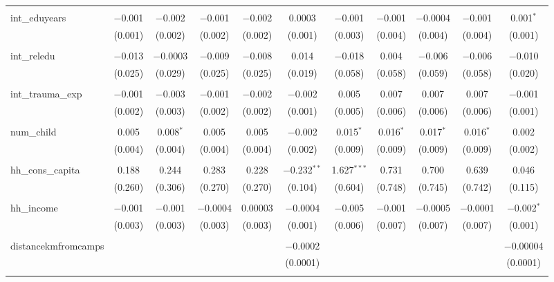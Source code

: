 \begin{table}[H]
\begin{tabular}{@{\extracolsep{4pt}}lcccccccccc}
  & & & & & & & & & & \\ 
 int\_eduyears & $-$0.001 & $-$0.002 & $-$0.001 & $-$0.002 & 0.0003 & $-$0.001 & $-$0.001 & $-$0.0004 & $-$0.001 & 0.001$^{*}$ \\ 
  & (0.001) & (0.002) & (0.002) & (0.002) & (0.001) & (0.003) & (0.004) & (0.004) & (0.004) & (0.001) \\ 
  & & & & & & & & & & \\ 
 int\_reledu & $-$0.013 & $-$0.0003 & $-$0.009 & $-$0.008 & 0.014 & $-$0.018 & 0.004 & $-$0.006 & $-$0.006 & $-$0.010 \\ 
  & (0.025) & (0.029) & (0.025) & (0.025) & (0.019) & (0.058) & (0.058) & (0.059) & (0.058) & (0.020) \\ 
  & & & & & & & & & & \\ 
 int\_trauma\_exp & $-$0.001 & $-$0.003 & $-$0.001 & $-$0.002 & $-$0.002 & 0.005 & 0.007 & 0.007 & 0.007 & $-$0.001 \\ 
  & (0.002) & (0.003) & (0.002) & (0.002) & (0.001) & (0.005) & (0.006) & (0.006) & (0.006) & (0.001) \\ 
  & & & & & & & & & & \\ 
 num\_child & 0.005 & 0.008$^{*}$ & 0.005 & 0.005 & $-$0.002 & 0.015$^{*}$ & 0.016$^{*}$ & 0.017$^{*}$ & 0.016$^{*}$ & 0.002 \\ 
  & (0.004) & (0.004) & (0.004) & (0.004) & (0.002) & (0.009) & (0.009) & (0.009) & (0.009) & (0.002) \\ 
  & & & & & & & & & & \\ 
 hh\_cons\_capita & 0.188 & 0.244 & 0.283 & 0.228 & $-$0.232$^{**}$ & 1.627$^{***}$ & 0.731 & 0.700 & 0.639 & 0.046 \\ 
  & (0.260) & (0.306) & (0.270) & (0.270) & (0.104) & (0.604) & (0.748) & (0.745) & (0.742) & (0.115) \\ 
  & & & & & & & & & & \\ 
 hh\_income & $-$0.001 & $-$0.001 & $-$0.0004 & 0.00003 & $-$0.0004 & $-$0.005 & $-$0.001 & $-$0.0005 & $-$0.0001 & $-$0.002$^{*}$ \\ 
  & (0.003) & (0.003) & (0.003) & (0.003) & (0.001) & (0.006) & (0.007) & (0.007) & (0.007) & (0.001) \\ 
  & & & & & & & & & & \\ 
 distancekmfromcamps &  &  &  &  & $-$0.0002 &  &  &  &  & $-$0.00004 \\ 
  &  &  &  &  & (0.0001) &  &  &  &  & (0.0001) \\ 
  & & & & & & & & & & \\ 

\end{tabular}
\end{table}
